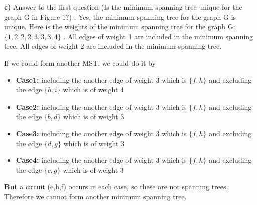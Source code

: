 \documentclass[11pt]{article}
\begin{document}
\begin{center}
\end{center}

\newpage
\noindent \textbf{c)} \newline \newline
Answer to the first question (Is the minimum spanning tree unique for the graph G in Figure 1?) : \newline \newline
Yes, the minimum spanning tree for the graph G is unique. \newline
Here is the weights of the minimum spanning tree for the graph G: $\{1,2,2,2,3,3,3,4\}$ . \newline \newline
All edges of weight 1 are included in the minimum spanning tree.  \newline
All edges of weight 2 are included in the minimum spanning tree. \newline \newline

If we could form another MST, we could do it by 
\begin{itemize}
    \item \textbf{Case1: }including the another edge of weight 3 which is $\{f,h\}$ and excluding the edge $\{h,i\}$ which is of weight 4
    \item \textbf{Case2: }including the another edge of weight 3 which is $\{f,h\}$ and excluding the edge $\{b,d\}$ which is of weight 3
    \item \textbf{Case3: }including the another edge of weight 3 which is $\{f,h\}$ and excluding the edge $\{d,g\}$ which is of weight 3
    \item \textbf{Case4: }including the another edge of weight 3 which is $\{f,h\}$ and excluding the edge $\{c,g\}$ which is of weight 3
\end{itemize}
\textbf{But} a circuit (e,h,f) occurs in each case, so these are not spanning trees. Therefore we cannot form another minimum spanning tree. \newline
\end{document}
